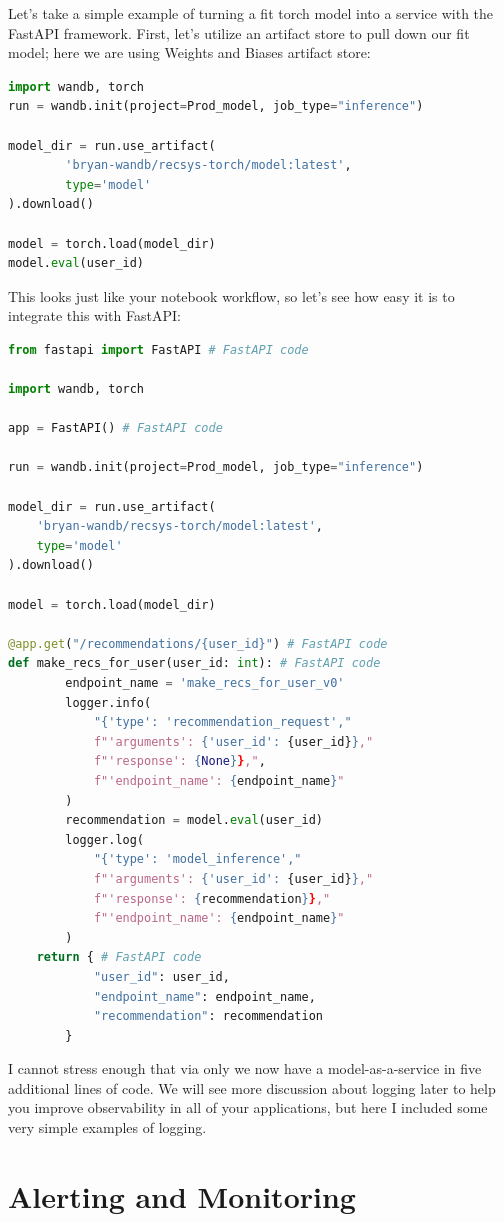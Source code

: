 Let's take a simple example of turning a fit torch model into a service with the FastAPI framework. First, let's utilize an artifact store to pull down our fit model; here we are using Weights and Biases artifact store:


\begin{lstlisting}[language=python]
import wandb, torch
run = wandb.init(project=Prod_model, job_type="inference")

model_dir = run.use_artifact(
		'bryan-wandb/recsys-torch/model:latest', 
		type='model'
).download()

model = torch.load(model_dir)
model.eval(user_id)
\end{lstlisting}

This looks just like your notebook workflow, so let's see how easy it is to integrate this with FastAPI:

\begin{lstlisting}[language=python]
from fastapi import FastAPI # FastAPI code

import wandb, torch

app = FastAPI() # FastAPI code

run = wandb.init(project=Prod_model, job_type="inference")

model_dir = run.use_artifact(
	'bryan-wandb/recsys-torch/model:latest', 
	type='model'
).download()

model = torch.load(model_dir)

@app.get("/recommendations/{user_id}") # FastAPI code
def make_recs_for_user(user_id: int): # FastAPI code
		endpoint_name = 'make_recs_for_user_v0'
		logger.info(
			"{'type': 'recommendation_request'," 
			f"'arguments': {'user_id': {user_id}}," 
			f"'response': {None}},",
			f"'endpoint_name': {endpoint_name}"
		)
		recommendation = model.eval(user_id)
		logger.log(
			"{'type': 'model_inference'," 
			f"'arguments': {'user_id': {user_id}}," 
			f"'response': {recommendation}},"
			f"'endpoint_name': {endpoint_name}"
		)
    return { # FastAPI code
			"user_id": user_id, 
			"endpoint_name": endpoint_name, 
			"recommendation": recommendation
		}
\end{lstlisting}

I cannot stress enough that via only we now have a model-as-a-service in five additional lines of code. We will see more discussion about logging later to help you improve observability in all of your applications, but here I included some very simple examples of logging. 

\section{Alerting and Monitoring}

